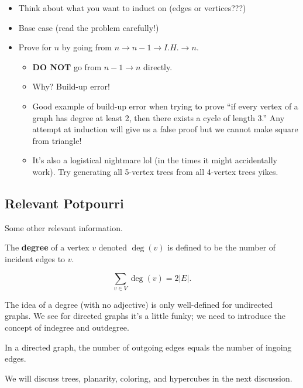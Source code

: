 \begin{itemize}
    \item Think about what you want to induct on (edges or vertices???)
    \item Base case (read the problem carefully!)
    \item Prove for $n$ by going from $n \to n-1 \to I.H. \to n$. 
    \begin{itemize}
        \item \textbf{DO NOT} go from $n-1 \to n$ directly.
        \item Why? Build-up error!
        \item Good example of build-up error when trying to prove ``if every vertex of a graph has degree at least 2, then there exists a cycle of length 3.'' Any attempt at induction will give us a false proof but we cannot make square from triangle! 
        \item It's also a logistical nightmare lol (in the times it might accidentally work). Try generating all 5-vertex trees from all 4-vertex trees yikes. 
    \end{itemize}
\end{itemize}

\subsection{Relevant Potpourri}

Some other relevant information. 

\begin{definition}[Degree]
    The \textbf{degree} of a vertex $v$ denoted $\deg(v)$ is defined to be the number of incident edges to $v$. 
\end{definition}

\begin{lemma}[Handshake]
    \[ \sum_{v \in V} \deg(v) = 2|E|. \]
\end{lemma}

The idea of a degree (with no adjective) is only well-defined for undirected graphs. We see for directed graphs it's a little funky; we need to introduce the concept of indegree and outdegree. 

In a directed graph, the number of outgoing edges equals the number of ingoing edges. 

We will discuss trees, planarity, coloring, and hypercubes in the next discussion. 